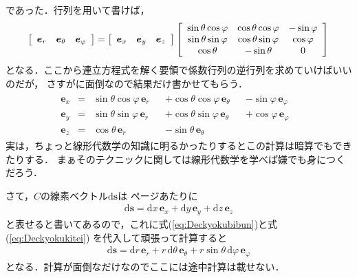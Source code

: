 であった．行列を用いて書けば，
\begin{align*}
\renewcommand{\arraystretch}{1}
\left[
\begin{array}{ccc}
\bm{e}_r & \bm{e}_\theta & \bm{e}_\varphi
\end{array}
\right]
= \left[
\renewcommand{\arraystretch}{1}
\begin{array}{ccc}
\bm{e}_x & \bm{e}_y & \bm{e}_z 
\end{array}
\right]
\left[
\renewcommand{\arraystretch}{1}
\begin{array}{ccc} 
\sin \theta \cos \varphi & \cos \theta \cos \varphi & - \sin \varphi \\
\sin \theta \sin \varphi & \cos \theta \sin \varphi & \cos \varphi \\
\cos \theta & - \sin \theta & 0
\end{array}
\right]
\end{align*}
となる．ここから連立方程式を解く要領で係数行列の逆行列を求めていけばいいのだが，
さすがに面倒なので結果だけ書かせてもらう．
\begin{align}
\begin{aligned}
\bm{e}_x & = & \sin \theta \cos \varphi \, \bm{e} _r & & 
+ \cos \theta \cos \varphi \, \bm{e}_\theta & & - \sin \varphi \, \bm{e}_\varphi & \\
\bm{e}_y & = & \sin \theta \sin \varphi \, \bm{e}_r & & 
+ \cos \theta \sin \varphi \, \bm{e}_\theta & & 
+ \cos \varphi \, \bm{e}_\varphi & \\
\bm{e}_z & = & \cos \theta \, \bm{e}_r & & - \sin \theta \, \bm{e}_\theta &
\label{eq:Deckyokukitei}
\end{aligned}
\end{align}
実は，ちょっと線形代数学の知識に明るかったりするとこの計算は暗算でもできたりする．
まぁそのテクニックに関しては線形代数学を学べば嫌でも身につくだろう．

さて，$C$の線素ベクトル$\mathrm{d}\bm{s}$は\pageref{eq:sensekibunvecseibun}
ページあたりに 
\begin{align}
\mathrm{d} \bm{s} = \mathrm{d} x \, \bm{e}_x + \mathrm{d} y \, \bm{e}_y + \mathrm{d} z \, \bm{e}_z
\label{eq:sensoDec}
\end{align}
と表せると書いてあるので，これに式(\ref{eq:Deckyokubibun})と式(\ref{eq:Deckyokukitei})
を代入して頑張って計算すると
\begin{align}
\mathrm{d} \bm{s} = \mathrm{d} r \, \bm{e}_r 
+ r \, \mathrm{d}\theta \, \bm{e}_\theta
+ r \sin \theta \, \mathrm{d} \varphi \, \bm{e}_\varphi
\label{eq:sensokyoku}
\end{align}
となる．計算が面倒なだけなのでここには途中計算は載せない．

